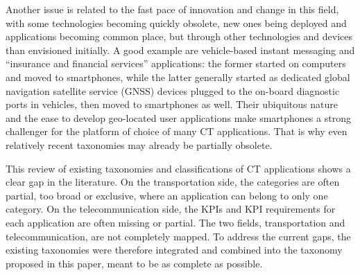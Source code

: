 Another issue is related to the fast pace of innovation and change in this field, with some technologies becoming quickly obsolete, new ones being deployed and applications becoming common place, but through other technologies and devices than envisioned initially. A good example are vehicle-based instant messaging and ``insurance and financial services''\cite{etsi_etsi_tr_102_638_intelligent_2009} applications: the former started on computers and moved to smartphones, while the latter generally started as dedicated global navigation satellite service (GNSS) devices plugged to the on-board diagnostic ports in vehicles, then moved to smartphones as well. Their ubiquitous nature and the ease to develop geo-located user applications make smartphones a strong challenger for the platform of choice of many \acrshort{CT} applications. That is why even relatively recent taxonomies may already be partially obsolete. 


This review of existing taxonomies and classifications of \acrshort{CT} applications shows a clear gap in the literature. On the transportation side, the categories are often partial, too broad or exclusive, where an application can belong to only one category. On the telecommunication side, the \acrshort{KPI}s and \acrshort{KPI} requirements for each application are often missing or partial. The two fields, transportation and telecommunication, are not completely mapped. To address the current gaps, the existing taxonomies were therefore integrated and combined into the taxonomy proposed in this paper, meant to be as complete as possible. 





